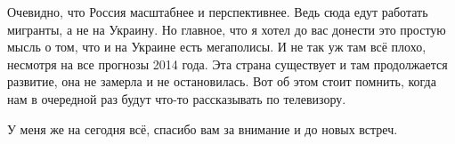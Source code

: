 Очевидно, что Россия масштабнее и перспективнее. Ведь сюда едут работать
мигранты, а не на Украину. Но главное, что я хотел до вас донести это простую
мысль о том, что и на Украине есть мегаполисы. И не так уж там всё плохо,
несмотря на все прогнозы 2014 года. Эта страна существует и там продолжается
развитие, она не замерла и не остановилась. Вот об этом стоит помнить, когда
нам в очередной раз будут что-то рассказывать по телевизору.

У меня же на сегодня всё, спасибо вам за внимание и до новых встреч.
